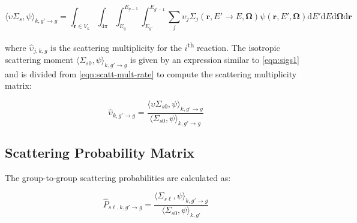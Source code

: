 \begin{equation}
\label{eqn:scatt-mult-rate}
\langle \upsilon \Sigma_{s}, \psi \rangle_{k,g'\rightarrow g} = \int_{\mathbf{r} \in V_{k}} \int_{4\pi} \int_{E_g}^{E_{g-1}} \int_{E_{g'}}^{E_{g'-1}} \sum_j \upsilon_j \Sigma_j (\mathbf{r}, E' \rightarrow E, \mathbf{\Omega}) \psi(\mathbf{r}, E', \mathbf{\Omega}) \mathrm{d}E'\mathrm{d}E\mathrm{d}\mathbf{\Omega}\mathrm{d}\mathbf{r}
\end{equation}

\noindent where $\hat{\upsilon}_{j,k,g}$ is the scattering multiplicity for the $i$\textsuperscript{th} reaction. The isotropic scattering moment $\langle \Sigma_{s0}, \psi \rangle_{k,g'\rightarrow g}$ is given by an expression similar to \autoref{eqn:sigs1} and is divided from \autoref{eqn:scatt-mult-rate} to compute the scattering multiplicity matrix:

\begin{equation}
\label{eqn:scatt-mult-mat}
\hat{\upsilon}_{k,g'\rightarrow g} = \frac{{\langle \upsilon \Sigma_{s0}, \psi \rangle}_{k,g'\rightarrow g}}{{\langle \Sigma_{s0}, \psi \rangle}_{k,g'\rightarrow g}}
\end{equation}

\subsection{Scattering Probability Matrix}
\label{subsubsec:tally-types-scatt-prob-mat}

The group-to-group scattering probabilities are calculated as:

%

\begin{equation}
\label{eqn:scatt-prob-mat}
\hat{P}_{s\ell,k,g'\rightarrow g} = \frac{{\langle \Sigma_{s\ell}, \psi \rangle}_{k,g'\rightarrow g}}{{\langle \Sigma_{s0}, \psi \rangle}_{k,g'}}
\end{equation}


